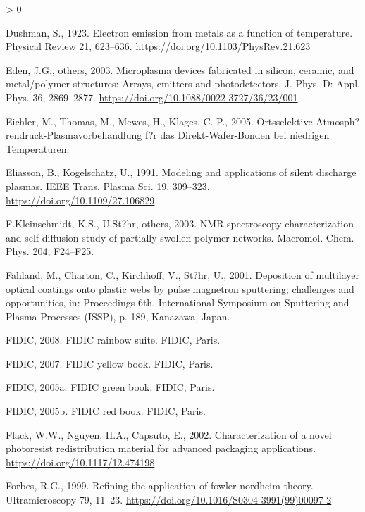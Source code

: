 \documentclass[
  11pt,
  twoside]{article}
\newlength{\cslhangindent}
\newenvironment{CSLReferences}[2] %
 {%
  \setlength{\parindent}{0pt}
  \ifodd #1 \everypar{\setlength{\hangindent}{\cslhangindent}}\ignorespaces\fi
  \ifnum #2 > 0
  \setlength{\parskip}{#2\baselineskip}
  \fi
 }%
 {}
\begin{document}
\begin{CSLReferences}{1}{0}
\leavevmode\hypertarget{ref-Dush1923}{}%
Dushman, S., 1923. Electron emission from metals as a function of temperature. Physical Review 21, 623--636. \url{https://doi.org/10.1103/PhysRev.21.623}

\leavevmode\hypertarget{ref-Eden03}{}%
Eden, J.G., others, 2003. Microplasma devices fabricated in silicon, ceramic, and metal/polymer structures: Arrays, emitters and photodetectors. J. Phys. D: Appl. Phys. 36, 2869--2877. \url{https://doi.org/10.1088/0022-3727/36/23/001}

\leavevmode\hypertarget{ref-Eich05}{}%
Eichler, M., Thomas, M., Mewes, H., Klages, C.-P., 2005. {Ortsselektive Atmosph?rendruck-Plasmavorbehandlung f?r das Direkt-Wafer-Bonden bei niedrigen Temperaturen}.

\leavevmode\hypertarget{ref-Elia1991}{}%
Eliasson, B., Kogelschatz, U., 1991. Modeling and applications of silent discharge plasmas. IEEE Trans. Plasma Sci. 19, 309--323. \url{https://doi.org/10.1109/27.106829}

\leavevmode\hypertarget{ref-Klei03}{}%
F.Kleinschmidt, K.S., U.St?hr, others, 2003. NMR spectroscopy characterization and self-diffusion study of partially swollen polymer networks. Macromol. Chem. Phys. 204, F24--F25.

\leavevmode\hypertarget{ref-Fahl01}{}%
Fahland, M., Charton, C., Kirchhoff, V., St?hr, U., 2001. Deposition of multilayer optical coatings onto plastic webs by pulse magnetron sputtering; challenges and opportunities, in: Proceedings 6th. International Symposium on Sputtering and Plasma Processes (ISSP), p. 189, Kanazawa, Japan.

\leavevmode\hypertarget{ref-FIDICrainbow}{}%
FIDIC, 2008. FIDIC rainbow suite. FIDIC, Paris.

\leavevmode\hypertarget{ref-FIDICyellow}{}%
FIDIC, 2007. FIDIC yellow book. FIDIC, Paris.

\leavevmode\hypertarget{ref-FIDICgreen}{}%
FIDIC, 2005a. FIDIC green book. FIDIC, Paris.

\leavevmode\hypertarget{ref-FIDICred}{}%
FIDIC, 2005b. FIDIC red book. FIDIC, Paris.

\leavevmode\hypertarget{ref-Flac02}{}%
Flack, W.W., Nguyen, H.A., Capsuto, E., 2002. Characterization of a novel photoresist redistribution material for advanced packaging applications. \url{https://doi.org/10.1117/12.474198}

\leavevmode\hypertarget{ref-Forb1999}{}%
Forbes, R.G., 1999. Refining the application of fowler-nordheim theory. Ultramicroscopy 79, 11--23. \url{https://doi.org/10.1016/S0304-3991(99)00097-2}


\end{CSLReferences}
\end{document}
